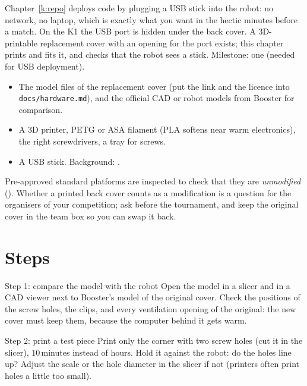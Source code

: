 \label{k:cover}

Chapter~\ref{k:repo} deploys code by plugging a USB stick into the robot: no network, no laptop, which is exactly what you want in the hectic minutes before a match. On the K1 the USB port is hidden under the back cover\guess. A 3D-printable replacement cover with an opening for the port exists; this chapter prints and fits it, and checks that the robot sees a stick. Milestone: one (needed for USB deployment).

\begin{needbox}
\begin{itemize}[nosep]
  \item The model files of the replacement cover (put the link and the licence into \texttt{docs/hardware.md}), and the official CAD or robot models from Booster for comparison\guess.
  \item A 3D printer, PETG or ASA filament (PLA softens near warm electronics), the right screwdrivers, a tray for screws.
  \item A USB stick. Background: .
\end{itemize}
\end{needbox}

\begin{guessbox}
Pre-approved standard platforms are inspected to check that they are \emph{unmodified} (). Whether a printed back cover counts as a modification is a question for the organisers of your competition; ask before the tournament, and keep the original cover in the team box so you can swap it back.
\end{guessbox}

\section*{Steps}
\begin{stepbox}{Step 1: compare the model with the robot}
Open the model in a slicer and in a CAD viewer next to Booster's model of the original cover. Check the positions of the screw holes, the clips, and every ventilation opening of the original: the new cover must keep them, because the computer behind it gets warm.
\end{stepbox}

\begin{stepbox}{Step 2: print a test piece}
Print only the corner with two screw holes (cut it in the slicer), $10$\,minutes instead of hours. Hold it against the robot: do the holes line up? Adjust the scale or the hole diameter in the slicer if not (printers often print holes a little too small).
\end{stepbox}

